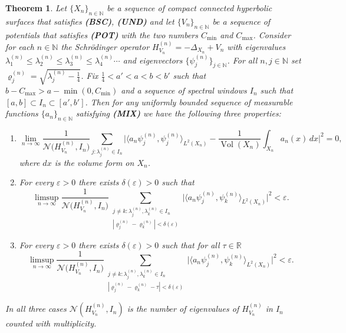 \documentclass[11pt,twoside,reqno]{amsart}
\newcommand{\R}{\mathbb{R}}
\newcommand{\N}{\mathbb{N}}
\renewcommand{\rho}{\varrho}
\newcommand{\1}{\mathrm{\mathbf{1}}}
\DeclareMathOperator{\Vol}{Vol}
\numberwithin{equation}{section}
\theoremstyle{plain}
\newtheorem{theorem}[thm]{Theorem}
\theoremstyle{definition}
\theoremstyle{remark}
\begin{document}
\begin{theorem}\label{thm:main}
    Let $ \{ X_{n} \}_{n\in\N} $ be a sequence of compact connected hyperbolic surfaces that satisfies {\normalfont\textbf{(BSC)}}, {\normalfont\textbf{(UND)}} and let $\{ V_{n} \}_{n\in\N} $ be a sequence of potentials that satisfies {\normalfont\textbf{(POT)}} with the two numbers $C_{\min}$ and $C_{\max}$. Consider for each $n\in\N$ the Schr\"odinger operator  $H_{V_n}^{(n)}= -\Delta_{X_n}+V_n$ with eigenvalues $\lambda_1^{(n)}\leq \lambda_2^{(n)}\leq \lambda_3^{(n)} \leq \lambda_4^{(n)} \cdots $ and eigenvectors $\{\psi_j^{(n)}\}_{j\in\N}$. For all $n,j\in\N$ set $\rho_{j}^{(n)} = \sqrt{\lambda_j^{(n)}-\frac{1}{4}}$. Fix $\frac{1}{4}< a' < a < b < b'$  such that $b-C_{\max}>a  -\min(0, C_{\min})$ and a sequence of spectral windows $I_n$ such that $[a,b] \subset I_n \subset [a',b']$. Then for any uniformly bounded sequence of measurable functions $\{a_n\}_{n\in\N}$ satisfying {\normalfont\textbf{(MIX)}} we have the following three properties:
    \begin{enumerate}
        \item[\emph{(1)}]
        \begin{equation*}
        \lim_{n\rightarrow \infty}\frac{1}{\mathcal{N}\big(H_{V_n}^{(n)},I_n\big)} \sum_{j:\lambda_j^{(n)}\in I_n} \Big| \langle a_n \psi_j^{(n)} , \psi_j^{(n)}\rangle_{L^2(X_n)} - \frac{1}{\Vol(X_n)} \int_{X_n} a_n(x)  \, dx \Big|^2 =0,
        \end{equation*}
        where $dx$ is the volume form on $X_n$.

        \item[\emph{(2)}] For every $\varepsilon>0$ there exists $\delta(\varepsilon)>0$ such that
        \begin{equation*}
        \limsup_{n\rightarrow \infty}\frac{1}{\mathcal{N}\big(H_{V_n}^{(n)},I_n\big)}  \sum_{\substack{j\neq k: \lambda_j^{(n)},\lambda_k^{(n)}\in I_n \\ |\rho_{j}^{(n)}-\rho_{k}^{(n)}| < \delta(\varepsilon)}} \Big| \langle a_n \psi_j^{(n)} , \psi_k^{(n)}\rangle_{L^2(X_n)}  \Big|^2 <\varepsilon.
        \end{equation*}

        \item[\emph{(3)}] For every $\varepsilon>0$ there exists $\delta(\varepsilon)>0$ such that for all $\tau\in\R$
        \begin{equation*}
        \limsup_{n\rightarrow \infty}\frac{1}{\mathcal{N}\big(H_{V_n}^{(n)},I_n\big)}  \sum_{\substack{j\neq k: \lambda_j^{(n)},\lambda_k^{(n)}\in I_n  \\ |\rho_{j}^{(n)}-\rho_{k}^{(n)}-\tau| < \delta(\varepsilon)}} \Big| \langle a_n \psi_j^{(n)} , \psi_k^{(n)}\rangle_{L^2(X_n)}  \Big|^2 <\varepsilon.
        \end{equation*}
    \end{enumerate}
    In all three cases $\mathcal{N}(H_{V_n}^{(n)},I_n)$ is the number of eigenvalues of $H_{V_n}^{(n)}$ in $I_n$ counted with multiplicity.
\end{theorem}
\end{document}

